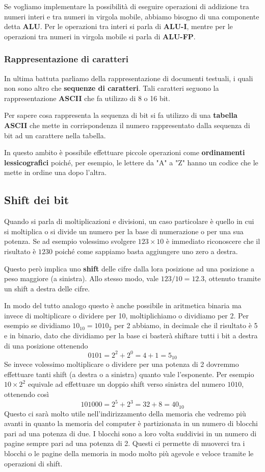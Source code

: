 Se vogliamo implementare la possibilità di eseguire operazioni di addizione tra numeri interi e tra
numeri in virgola mobile, abbiamo bisogno di una componente detta \textbf{ALU}. Per le operazioni
tra interi si parla di \textbf{ALU-I}, mentre per le operazioni tra numeri in virgola mobile si
parla di \textbf{ALU-FP}.

\subsubsection{Rappresentazione di caratteri}
In ultima battuta parliamo della rappresentazione di documenti testuali, i quali non sono altro
che \textbf{sequenze di caratteri}. Tali caratteri seguono la rappresentazione \textbf{ASCII} che
fa utilizzo di 8 o 16 bit.

Per sapere cosa rappresenta la sequenza di bit si fa utilizzo di una \textbf{tabella ASCII} che
mette in corrispondenza il numero rappresentato dalla sequenza di bit ad un carattere nella tabella.

In questo ambito è possibile effettuare piccole operazioni come \textbf{ordinamenti lessicografici}
poiché, per esempio, le lettere da "A" a "Z" hanno un codice che le mette in ordine una dopo
l'altra.

\subsection{Shift dei bit}
Quando si parla di moltiplicazioni e divisioni, un caso particolare è quello in cui si moltiplica
o si divide un numero per la base di numerazione o per una sua potenza. Se ad esempio volessimo
svolgere $123 \times 10$ è immediato riconoscere che il risultato è $1230$ poiché come sappiamo
basta aggiungere uno zero a destra.

Questo però implica uno \textbf{shift} delle cifre dalla lora posizione ad una posizione a peso
maggiore (a sinistra). Allo stesso modo, vale $123 / 10 = 12.3$, ottenuto tramite un shift a destra
delle cifre.

In modo del tutto analogo questo è anche possibile in aritmetica binaria ma invece di moltiplicare
o dividere per 10, moltiplichiamo o dividiamo per 2. Per esempio se dividiamo $10_{10} = 1010_2$
per 2 abbiamo, in decimale che il risultato è 5 e in binario, dato che dividiamo per la base ci
basterà shiftare tutti i bit a destra di una posizione ottenendo
\[ 0101 = 2^2 + 2^0 = 4 + 1 = 5_{10} \]
Se invece volessimo moltiplicare o dividere per una potenza di 2 dovremmo effettuare tanti shift
(a destra o a sinistra) quanto vale l'esponente. Per esempio $10 \times 2^2$ equivale ad effettuare
un doppio shift verso sinistra del numero $1010$, ottenendo così
\[ 101000 = 2^5 + 2^3 = 32 + 8 = 40_{10} \]
Questo ci sarà molto utile nell'indirizzamento della memoria che vedremo più avanti in quanto la
memoria del computer è partizionata in un numero di blocchi pari ad una potenza di due. I blocchi
sono a loro volta suddivisi in un numero di pagine sempre pari ad una potenza di 2. Questi ci
permette di muoverci tra i blocchi o le pagine della memoria in modo molto più agevole e veloce
tramite le operazioni di shift.

